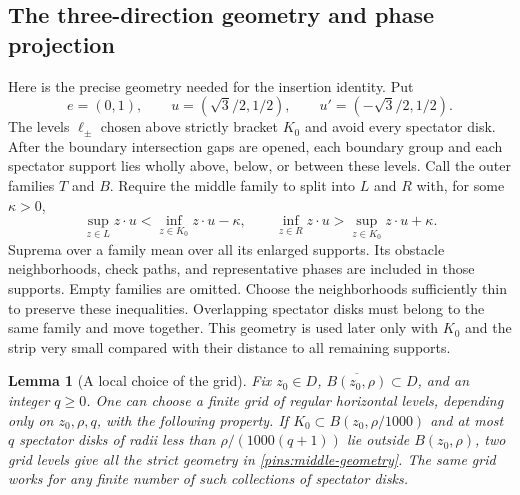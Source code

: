 \documentclass[11pt]{article}
\newtheorem{lemma}[theorem]{Lemma}
\theoremstyle{definition}
\theoremstyle{remark}
\numberwithin{equation}{section}
\begin{document}
\subsection{The three-direction geometry and phase projection}

Here is the precise geometry needed for the insertion identity.  Put
\begin{equation}\label{pins:three-normals}
 e=(0,1),\qquad u=(\sqrt3/2,1/2),\qquad
 u'=(-\sqrt3/2,1/2).
\end{equation}
The levels $\ell_\pm$ chosen above strictly bracket $K_0$ and avoid
every spectator disk.  After the boundary intersection gaps are opened,
each boundary group and each spectator support lies wholly above,
below, or between these levels.  Call the outer families $T$ and $B$.
Require the middle family to split into $L$ and $R$ with, for some
$\kappa>0$,
\begin{equation}\label{pins:middle-geometry}
 \sup_{z\in L}z\cdot u<\inf_{z\in K_0}z\cdot u-\kappa,
 \qquad
 \inf_{z\in R}z\cdot u>\sup_{z\in K_0}z\cdot u+\kappa.
\end{equation}
Suprema over a family mean over all its enlarged supports.  Its
obstacle neighborhoods, check paths, and representative phases are
included in those supports.  Empty families are omitted.  Choose the
neighborhoods sufficiently thin to preserve these inequalities.
Overlapping spectator disks must belong to the same family and move
together.  This geometry is used later only with $K_0$ and the strip
very small compared with their distance to all remaining supports.

\begin{lemma}[A local choice of the grid]\label{pins:local-geometry}
Fix $z_0\in D$, $\overline{B(z_0,\rho)}\subset D$, and an integer
$q\ge0$.  One can choose a finite grid of regular horizontal levels,
depending only on $z_0,\rho,q$, with the following property.  If
$K_0\subset B(z_0,\rho/1000)$ and at most $q$ spectator disks of
radii less than $\rho/(1000(q+1))$ lie outside $B(z_0,\rho)$, two
grid levels give all the strict geometry in
\eqref{pins:middle-geometry}.  The same grid works for any finite
number of such collections of spectator disks.
\end{lemma}
\end{document}
